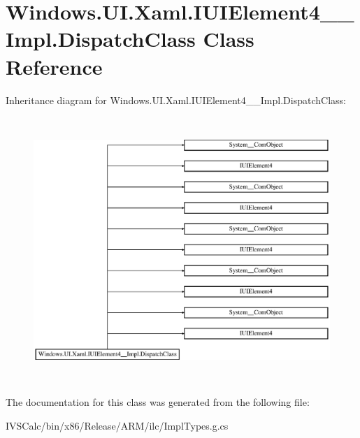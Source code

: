 \hypertarget{class_windows_1_1_u_i_1_1_xaml_1_1_i_u_i_element4_____impl_1_1_dispatch_class}{}\section{Windows.\+U\+I.\+Xaml.\+I\+U\+I\+Element4\+\_\+\+\_\+\+Impl.\+Dispatch\+Class Class Reference}
\label{class_windows_1_1_u_i_1_1_xaml_1_1_i_u_i_element4_____impl_1_1_dispatch_class}
Inheritance diagram for Windows.\+U\+I.\+Xaml.\+I\+U\+I\+Element4\+\_\+\+\_\+\+Impl.\+Dispatch\+Class\+:\begin{figure}[H]
\begin{center}
\leavevmode
\includegraphics[height=10.065359cm]{class_windows_1_1_u_i_1_1_xaml_1_1_i_u_i_element4_____impl_1_1_dispatch_class}
\end{center}
\end{figure}


The documentation for this class was generated from the following file\+:\begin{DoxyCompactItemize}
\item 
I\+V\+S\+Calc/bin/x86/\+Release/\+A\+R\+M/ilc/Impl\+Types.\+g.\+cs\end{DoxyCompactItemize}
